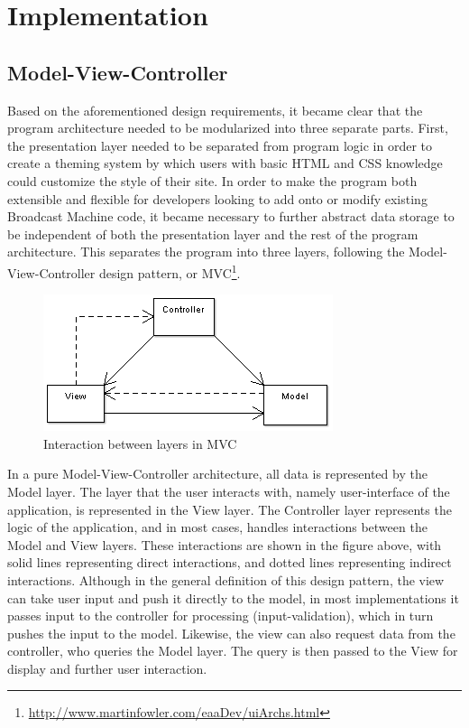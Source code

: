 \documentclass[a4paper,12pt]{report}
\begin{document}
\chapter{Implementation}

\section{Model-View-Controller}
Based on the aforementioned design requirements, it became clear that the program architecture needed to be modularized into three separate parts. First, the presentation layer needed to be separated from program logic in order to create a theming system by which users with basic HTML and CSS knowledge could customize the style of their site. In order to make the program both extensible and flexible for developers looking to add onto or modify existing Broadcast Machine code, it became necessary to further abstract data storage to be independent of both the presentation layer and the rest of the program architecture. This separates the program into three layers, following the Model-View-Controller design pattern, or MVC\footnote{\url{http://www.martinfowler.com/eaaDev/uiArchs.html}}.


\begin{figure}[h]
\begin{center}
\includegraphics[scale=0.6]{./images/mvc.png}
\end{center}
\caption{Interaction between layers in MVC}
\end{figure}
In a pure Model-View-Controller architecture, all data is represented by the Model layer. The layer that the user interacts with, namely user-interface of the application, is represented in the View layer. The Controller layer represents the logic of the application, and in most cases, handles interactions between the Model and View layers. These interactions are shown in the figure above, with solid lines representing direct interactions, and dotted lines representing indirect interactions. Although in the general definition of this design pattern, the view can take user input and push it directly to the model, in most implementations it passes input to the controller for processing (input-validation), which in turn pushes the input to the model. Likewise, the view can also request data from the controller, who queries the Model layer. The query is then passed to the View for display and further user interaction.
\end{document}
